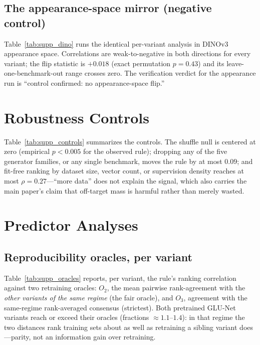 \documentclass[runningheads]{llncs}
\begin{document}
\subsection{The appearance-space mirror (negative control)}
Table~\ref{tab:supp_dino} runs the identical per-variant analysis in DINOv3
appearance space. Correlations are weak-to-negative in both directions for
every variant; the flip statistic is $+0.018$ (exact permutation $p{=}0.43$)
and its leave-one-benchmark-out range crosses zero. The verification verdict
for the appearance run is ``control confirmed: no appearance-space flip.''

\begin{table}[h]
\centering
\caption{The same analysis as main-paper Table~3 (the coverage law), in appearance (DINO) space.
No direction carries usable signal (all $\rho \in [-0.35,-0.15]$) and the
aggregate flip is null ($+0.018$, $p{=}0.43$).}
\label{tab:supp_dino}
\scriptsize

\end{table}

\section{Robustness Controls}
\label{supp:robust}

Table~\ref{tab:supp_controls} summarizes the controls. The shuffle null is
centered at zero (empirical $p{<}0.005$ for the observed rule); dropping any
of the five generator families, or any single benchmark, moves the rule by at
most $0.09$; and fit-free ranking by dataset size, vector count, or
supervision density reaches at most $\rho{=}0.27$---``more data'' does not
explain the signal, which also carries the main paper's claim that off-target
mass is harmful rather than merely wasted.

\begin{table}[h]
\centering
\caption{Robustness controls for the fit-free rule.}
\label{tab:supp_controls}
\small

\end{table}

\section{Predictor Analyses}
\label{supp:predict}

\subsection{Reproducibility oracles, per variant}
Table~\ref{tab:supp_oracles} reports, per variant, the rule's ranking
correlation against two retraining oracles: $O_2$, the mean pairwise
rank-agreement with the \emph{other variants of the same regime} (the fair
oracle), and $O_3$, agreement with the same-regime rank-averaged consensus
(strictest). Both pretrained GLU-Net variants reach or exceed their oracles
(fractions ${\approx}1.1$--$1.4$): in that regime the two distances rank
training sets about as well as retraining a sibling variant does---parity,
not an information gain over retraining.
\end{document}
